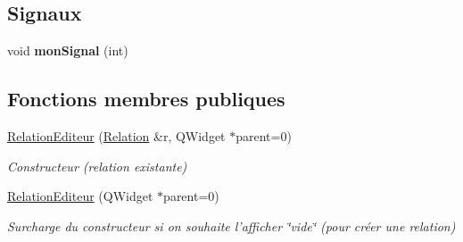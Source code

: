 \subsection*{Signaux}
\begin{DoxyCompactItemize}
\item 
\hypertarget{class_relation_editeur_aa4a4cc9b587d9898ddefa6e7f522f904}{void {\bfseries mon\-Signal} (int)}\label{class_relation_editeur_aa4a4cc9b587d9898ddefa6e7f522f904}

\end{DoxyCompactItemize}
\subsection*{Fonctions membres publiques}
\begin{DoxyCompactItemize}
\item 
\hyperlink{class_relation_editeur_abd28cab2327f3638a00d4e93dcec89fe}{Relation\-Editeur} (\hyperlink{class_relation}{Relation} \&r, Q\-Widget $\ast$parent=0)
\begin{DoxyCompactList}\small\item\em Constructeur (relation existante) \end{DoxyCompactList}\item 
\hypertarget{class_relation_editeur_a18f183e49135d7cf1ecbd809b49d60fc}{\hyperlink{class_relation_editeur_a18f183e49135d7cf1ecbd809b49d60fc}{Relation\-Editeur} (Q\-Widget $\ast$parent=0)}\label{class_relation_editeur_a18f183e49135d7cf1ecbd809b49d60fc}

\begin{DoxyCompactList}\small\item\em Surcharge du constructeur si on souhaite l'afficher \char`\"{}vide\char`\"{} (pour créer une relation) \end{DoxyCompactList}\end{DoxyCompactItemize}
